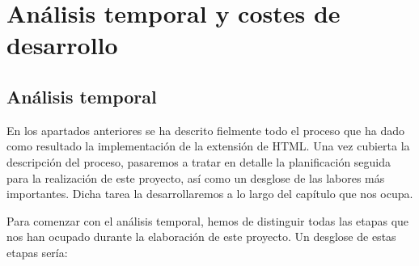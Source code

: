 \chapter{Análisis temporal y costes de desarrollo}\label{anatemporal}

\section{Análisis temporal}

En los apartados anteriores se ha descrito fielmente todo el proceso que ha dado como resultado la implementación de la extensión de HTML. Una vez cubierta la descripción del proceso, pasaremos a tratar en detalle la planificación seguida para la realización de este proyecto, así como un desglose de las labores más importantes. Dicha tarea la desarrollaremos a lo largo del capítulo que nos ocupa.

Para comenzar con el análisis temporal, hemos de distinguir todas las etapas que nos han ocupado durante la   elaboración de este proyecto. Un desglose de estas etapas sería:

